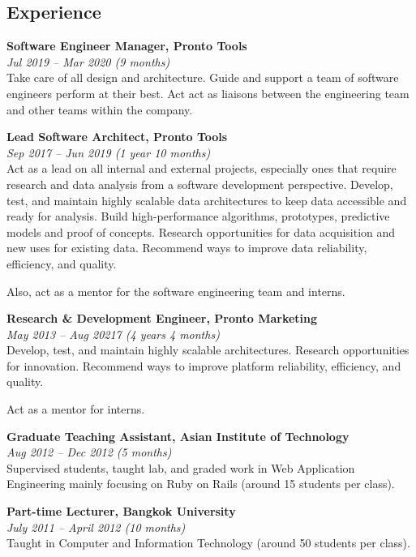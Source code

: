 \documentclass[margin, 10pt]{res}
\begin{document}
\begin{resume}
\section{Experience}

{\bf Software Engineer Manager, Pronto Tools}\\
{\it \small Jul 2019 -- Mar 2020 (9 months)}\\
Take care of all design and architecture. Guide and support a team of
software engineers perform at their best. Act act as liaisons between
the engineering team and other teams within the company.

{\bf Lead Software Architect, Pronto Tools}\\
{\it \small Sep 2017 -- Jun 2019 (1 year 10 months)}\\
Act as a lead on all internal and external projects, especially ones that
require research and data analysis from a software development perspective.
Develop, test, and maintain highly scalable data architectures to keep data
accessible and ready for analysis. Build high-performance algorithms,
prototypes, predictive models and proof of concepts. Research opportunities
for data acquisition and new uses for existing data. Recommend ways to
improve data reliability, efficiency, and quality.

Also, act as a mentor for the software engineering team and interns.

{\bf Research \& Development Engineer, Pronto Marketing}\\
{\it \small May 2013 -- Aug 20217 (4 years 4 months)}\\
Develop, test, and maintain highly scalable architectures.
Research opportunities for innovation. Recommend ways to improve
platform reliability, efficiency, and quality.

Act as a mentor for interns.

{\bf Graduate Teaching Assistant, Asian Institute of Technology}\\
{\it \small Aug 2012 -- Dec 2012 (5 months)}\\
Supervised students, taught lab, and graded work in Web Application Engineering
mainly focusing on Ruby on Rails (around 15 students per class).

{\bf Part-time Lecturer, Bangkok University}\\
{\it \small July 2011 -- April 2012 (10 months)}\\
Taught in Computer and Information Technology (around 50 students per class).


\end{resume}
\end{document}
